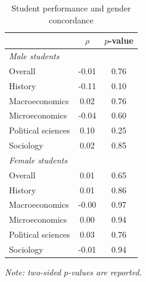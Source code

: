 \documentclass[12pt]{article}
\begin{document}
\begin{table}[htbp]
  \centering
  \footnotesize 
  \caption{Student performance and gender concordance}
    \begin{tabular}{lcc}
    \toprule 
                          & $\rho$  & $p$-value   \\
   \midrule
     \multicolumn{3}{l}{\textit{Male students}} \\     
      \quad  Overall &                 -0.01       & 0.76      \\
      \quad  History &                 -0.11       & 0.10        \\
      \quad  Macroeconomics &           0.02       & 0.76        \\
      \quad  Microeconomics &          -0.04       & 0.60        \\
      \quad  Political sciences &       0.10       & 0.25        \\
      \quad  Sociology &                0.02       & 0.85        \\
   \midrule
     \multicolumn{3}{l}{\textit{Female students}} \\     
      \quad  Overall &                  0.01       & 0.65        \\
      \quad  History &                  0.01       & 0.86        \\
      \quad  Macroeconomics &          -0.00       & 0.97        \\
      \quad  Microeconomics &           0.00       & 0.94      \\
      \quad  Political sciences &       0.03       & 0.76        \\
      \quad  Sociology &               -0.01       & 0.94        \\
    \bottomrule
    \end{tabular}%
 \label{tab:gender concordance}%
  
  \textit{Note: two-sided $p$-values are reported.}
\end{table}%
\normalsize
\end{document}
